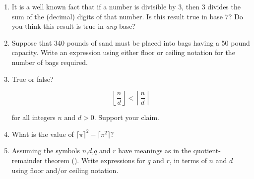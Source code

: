 \begin{enumerate}
\wbvfill

\workbookpagebreak

\item It is a well known fact that if a number is divisible by 3, then 3
  divides the sum of the (decimal) digits of that number.  Is this
  result true in base 7?  Do you think this result is true in {\em
  any} base? 
 
 \wbvfill
 

\item Suppose that 340 pounds of sand must be placed into bags having
  a 50 pound capacity.  Write an expression using either floor or
  ceiling notation for the number of bags required.

\wbvfill


\textbookpagebreak

\item True or false? 

\[ \left\lfloor \frac{n}{d}\right\rfloor < \left\lceil \frac{n}{d}\right\rceil \]
 
\noindent for all integers $n$ and $d>0$.  Support your claim.

\wbvfill


\workbookpagebreak

\item What is the value of $\lceil\pi\rceil^{2}-\lceil\pi^{2}\rceil$?

\wbvfill




\item Assuming the symbols $n$,$d$,$q$ and $r$ have meanings as in the
  quotient-remainder theorem ().  Write
  expressions for $q$ and $r$, in terms of $n$ and $d$ using floor
  and/or ceiling notation.

\wbvfill


\end{enumerate}
